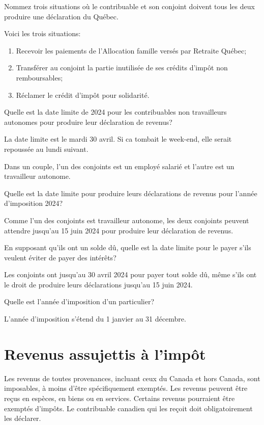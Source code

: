 \begin{question}
	Nommez trois situations où le contribuable et son conjoint doivent tous les deux produire une déclaration du Québec.
\end{question}
Voici les trois situations:
\begin{enumerate}
	\item Recevoir les paiements de l'Allocation famille versés par Retraite Québec;
	\item Transférer au conjoint la partie inutilisée de ses crédits d'impôt non remboursables;
	\item Réclamer le crédit d'impôt pour solidarité.
\end{enumerate}

\begin{question}
	Quelle est la date limite de 2024 pour les contribuables non travailleurs autonomes pour produire leur déclaration de revenus?
\end{question}
La date limite est le mardi 30 avril. Si ca tombait le week-end, elle serait repoussée au lundi suivant.

\begin{question}
	Dans un couple, l'un des conjoints est un employé salarié et l'autre est un travailleur autonome.
\end{question}
\setcounter{sousQuestion}{0}
\begin{sousQuestion}
	Quelle est la date limite pour produire leurs déclarations de revenus pour l'année d'imposition 2024?
\end{sousQuestion}
Comme l'un des conjoints est travailleur autonome, les deux conjoints peuvent attendre jusqu'au 15 juin 2024 pour produire leur déclaration de revenus.
\begin{sousQuestion}
	En supposant qu'ils ont un solde dû, quelle est la date limite pour le payer s'ils veulent éviter de payer des intérêts?
\end{sousQuestion}
Les conjoints ont jusqu'au 30 avril 2024 pour payer tout solde dû, même s'ils ont le droit de produire leurs déclarations jusqu'au 15 juin 2024.

\begin{question}
	Quelle est l'année d'imposition d'un particulier?
\end{question}
L'année d'imposition s'étend du 1 janvier au 31 décembre.



\section{Revenus assujettis à l'impôt}
\begin{intro}
	Les revenus de toutes provenances, incluant ceux du Canada et hors Canada, sont imposables, à moins d'être spécifiquement exemptés. Les revenus peuvent être reçus en espèces, en biens ou en services. Certains revenus pourraient être exemptés d'impôts. Le contribuable canadien qui les reçoit doit obligatoirement les déclarer.
\end{intro}


